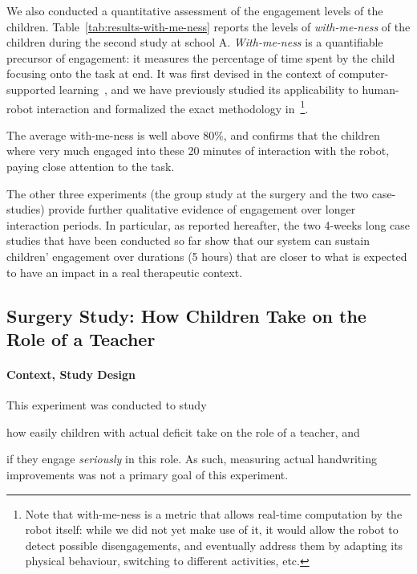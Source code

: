 \documentclass{article}
\begin{document}
We also conducted a quantitative assessment of the engagement levels of the
children. Table~\ref{tab:results-with-me-ness} reports the levels of
\emph{with-me-ness} of the children during the second study at school A.
\emph{With-me-ness} is a quantifiable precursor of engagement: it measures the
percentage of time spent by the child focusing onto the task at end. It was
first devised in the context of computer-supported
learning~\cite{sharma2014me}, and we have previously studied its applicability to
human-robot interaction and formalized the exact methodology
in~\cite{lemaignan2016realtime}\footnote{Note that with-me-ness is a metric that
allows real-time computation by the robot itself: while we did not yet make
use of it, it would allow the robot to detect possible disengagements, and
eventually address them by adapting its physical behaviour, switching to
different activities, etc.}.

The average with-me-ness is well above 80\%, and confirms that the children
where very much engaged into these 20 minutes of interaction with the robot,
paying close attention to the task.

The other three experiments (the group study at the surgery and the two
case-studies) provide further qualitative evidence of engagement over longer
interaction periods. In particular, as reported hereafter, the two 4-weeks long
case studies that have been conducted so far show that our system can sustain
children' engagement over durations (5 hours) that are closer to what is
expected to have an impact in a real therapeutic context.

\subsection{Surgery Study: How Children Take on the Role of a Teacher}\label{normandie}

\paragraph{Context, Study Design}

\begin{inparaenum}[\itshape 1\upshape)]
This experiment was conducted to study \item how easily children with actual
deficit take on the role of a teacher, and \item if they engage \emph{seriously}
in this role. As such, measuring actual handwriting improvements was not a primary goal
of this experiment.
\end{inparaenum}
\end{document}
